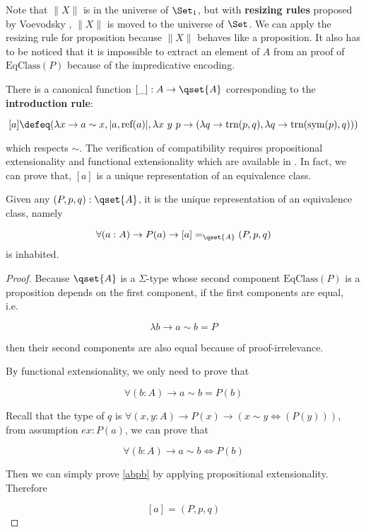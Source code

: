 \begin{remark}
Note that $\|X\|$ is in the universe of $\Set_1$, but with \textbf{resizing rules} proposed by Voevodsky \cite{Universe-poly,RR}, $\|X\|$ is moved to the universe of $\Set$. We can apply the resizing rule for proposition because $\|X\|$ behaves like a proposition.
It also has to be noticed that it is impossible to extract an element of $A$ from an proof of $\text{EqClass}(P)$ because of the impredicative encoding. 
\end{remark}

There is a canonical function $[\_] : A \to \qset{A}$ corresponding to the \textbf{introduction rule}:

$$[ a ] \defeq (\lambda x \to a \sim x, | a, \text{ref}(a) | , \lambda x~y ~p \to (\lambda q \to\text{trn}(p,q), \lambda q \to \text{trn}(\text{sym}(p),q)))$$

which respects $\sim$. The verification of compatibility requires propositional extensionality and functional extensionality which are available in \hott.
In fact, we can prove that, $[a]$ is a unique representation of an equivalence class.

\begin{lemma}\label{uniquerepresentation}
Given any $(P,p,q) : \qset{A}$, it is the unique representation of an equivalence class, namely

$$\forall (a : A) \to P(a) \to [a] =_{\qset{A}} (P,p,q)$$ is inhabited.
\end{lemma}
\begin{proof}

Because $\qset{A}$ is a $\Sigma$-type whose second component $\text{EqClass}(P)$ is a proposition depends on the first component, if the first components are equal, i.e.\

$$\lambda b \to a \sim b = P$$

then their second components are also equal because of proof-irrelevance.

By functional extensionality, we only need to prove that

\begin{equation}\label{abpb}
\forall(b : A) \to a \sim b = P(b)
\end{equation}

Recall that the type of $q$ is $\forall(x,y : A) \to P(x) \to (x \sim y \iff (P(y)))$, from assumption $ex : P(a)$, we can prove that 


$$\forall(b : A) \to a \sim b \iff P(b)$$

Then we can simply prove \ref{abpb} by applying propositional extensionality.
Therefore

$$[a] = (P,p,q)$$ 

\end{proof}

